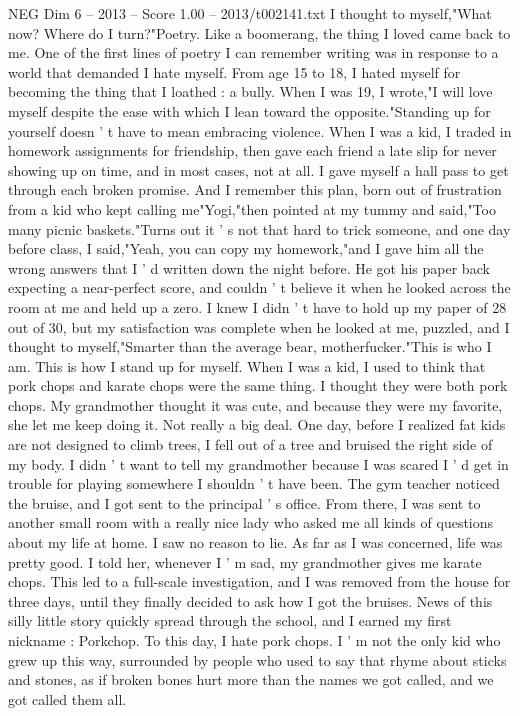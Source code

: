 \begin{textsample}{NEG Dim 6 – 2013 – Score 1.00 – 2013/t002141.txt}
I thought to myself,"What now?
Where do I turn?"Poetry.
Like a boomerang, the thing I loved came back to me.
One of the first lines of poetry I can remember writing was in response to a world that demanded I hate myself.
From age 15 to 18, I hated myself for becoming the thing that I loathed : a bully.
When I was 19, I wrote,"I will love myself despite the ease with which I lean toward the opposite."Standing up for yourself doesn ' t have to mean embracing violence.
When I was a kid, I traded in homework assignments for friendship, then gave each friend a late slip for never showing up on time, and in most cases, not at all.
I gave myself a hall pass to get through each broken promise.
And I remember this plan, born out of frustration from a kid who kept calling me"Yogi,"then pointed at my tummy and said,"Too many picnic baskets."Turns out it ' s not that hard to trick someone, and one day before class, I said,"Yeah, you can copy my homework,"and I gave him all the wrong answers that I ' d written down the night before.
He got his paper back expecting a near-perfect score, and couldn ' t believe it when he looked across the room at me and held up a zero.
I knew I didn ' t have to hold up my paper of 28 out of 30, but my satisfaction was complete when he looked at me, puzzled, and I thought to myself,"Smarter than the average bear, motherfucker."This is who I am.
This is how I stand up for myself.
When I was a kid, I used to think that pork chops and karate chops were the same thing.
I thought they were both pork chops.
My grandmother thought it was cute, and because they were my favorite, she let me keep doing it.
Not really a big deal.
One day, before I realized fat kids are not designed to climb trees, I fell out of a tree and bruised the right side of my body.
I didn ' t want to tell my grandmother because I was scared I ' d get in trouble for playing somewhere I shouldn ' t have been.
The gym teacher noticed the bruise, and I got sent to the principal ' s office.
From there, I was sent to another small room with a really nice lady who asked me all kinds of questions about my life at home.
I saw no reason to lie.
As far as I was concerned, life was pretty good.
I told her, whenever I ' m sad, my grandmother gives me karate chops.
This led to a full-scale investigation, and I was removed from the house for three days, until they finally decided to ask how I got the bruises.
News of this silly little story quickly spread through the school, and I earned my first nickname : Porkchop.
To this day, I hate pork chops.
I ' m not the only kid who grew up this way, surrounded by people who used to say that rhyme about sticks and stones, as if broken bones hurt more than the names we got called, and we got called them all.

\end{textsample}

